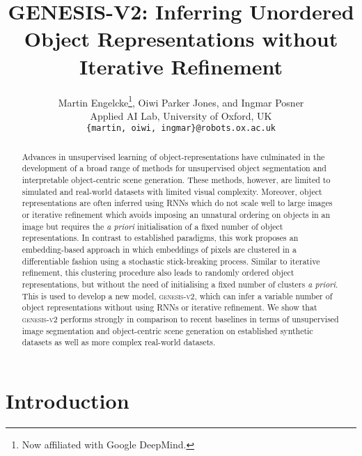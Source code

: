 \documentclass{article}
\title{GENESIS-V2: Inferring Unordered Object Representations without Iterative Refinement}
\author{Martin Engelcke\thanks{Now affiliated with Google DeepMind.}, Oiwi Parker Jones, and Ingmar Posner\\
  Applied AI Lab, University of Oxford, UK\\
  \texttt{\{martin, oiwi, ingmar\}@robots.ox.ac.uk} \\
}
\begin{document}
\maketitle


\begin{abstract}
Advances in unsupervised learning of object-representations have culminated in the development of a broad range of methods for unsupervised object segmentation and interpretable object-centric scene generation.
These methods, however, are limited to simulated and real-world datasets with limited visual complexity.
Moreover, object representations are often inferred using RNNs which do not scale well to large images or iterative refinement which avoids imposing an unnatural ordering on objects in an image but requires the \emph{a priori} initialisation of a fixed number of object representations.
In contrast to established paradigms, this work proposes an embedding-based approach in which embeddings of pixels are clustered in a differentiable fashion using a stochastic stick-breaking process.
Similar to iterative refinement, this clustering procedure also leads to randomly ordered object representations, but without the need of initialising a fixed number of clusters \emph{a priori}.
This is used to develop a new model, \textsc{genesis-v2}, which can infer a variable number of object representations without using RNNs or iterative refinement.
We show that \textsc{genesis-v2} performs strongly in comparison to recent baselines in terms of unsupervised image segmentation and object-centric scene generation on established synthetic datasets as well as more complex real-world datasets.
\end{abstract}

\section{Introduction}
\end{document}

